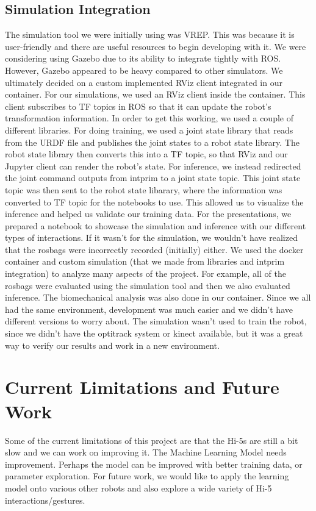 \documentclass[letterpaper, 10 pt, conference]{ieeeconf}  %
\begin{document}
\subsection{Simulation Integration} 
The simulation tool we were initially using was VREP. This was because it is user-friendly and there are useful resources to begin developing with it. We were considering using Gazebo due to its ability to integrate tightly with ROS. However, Gazebo appeared to be heavy compared to other simulators. We ultimately decided on a custom implemented RViz client integrated in our container. 
\newline
\indent
For our simulations, we used an RViz client inside the container. This client subscribes to TF topics in ROS so that it can update the robot's transformation information. In order to get this working, we used a couple of different libraries. For doing training, we used a joint state library that reads from the URDF file and publishes the joint states to a robot state library. The robot state library then converts this into a TF topic, so that RViz and our Jupyter client can render the robot's state. For inference, we instead redirected the joint command outputs from intprim to a joint state topic. This joint state topic was then sent to the robot state libarary, where the information was converted to TF topic for the notebooks to use. This allowed us to visualize the inference and helped us validate our training data. For the presentations, we prepared a notebook to showcase the simulation and inference with our different types of interactions. If it wasn't for the simulation, we wouldn't have realized that the rosbags were incorrectly recorded (initially) either.
\newline
\indent We used the docker container and custom simulation (that we made from libraries and intprim integration) to analyze many aspects of the project. For example, all of the rosbags were evaluated using the simulation tool and then we also evaluated inference. The biomechanical analysis was also done in our container. Since we all had the same environment, development was much easier and we didn't have different versions to worry about. The simulation wasn't used to train the robot, since we didn't have the optitrack system or kinect available, but it was a great way to verify our results and work in a new environment.


\section{Current Limitations and Future Work}
Some of the current limitations of this project are that the Hi-5s are still a bit slow and we can work on improving it. The Machine Learning Model needs improvement. Perhaps the model can be improved with better training data, or parameter exploration. For future work, we would like to apply the learning model onto various other robots and also explore a wide variety of Hi-5 interactions/gestures.
\end{document}
